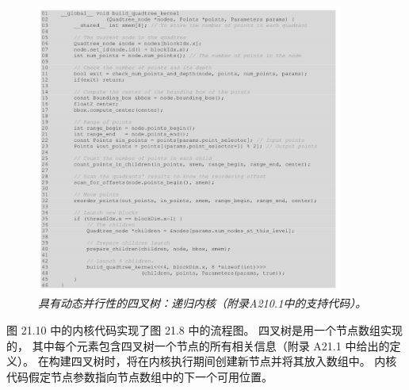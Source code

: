 \begin{figure}[H]
	\centering
	\includegraphics[width=0.9\textwidth]{figs/F21.10.png}
	\caption{\textit{具有动态并行性的四叉树：递归内核（附录A210.1中的支持代码）。}}
\end{figure}

图 21.10 中的内核代码实现了图 21.8 中的流程图。 四叉树是用一个节点数组实现的，
其中每个元素包含四叉树一个节点的所有相关信息（附录 A21.1 中给出的定义）。 
在构建四叉树时，将在内核执行期间创建新节点并将其放入数组中。 内核代码假定节点参数指向节点数组中的下一个可用位置。

